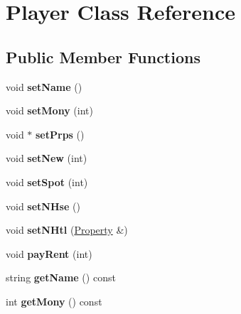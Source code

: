 \hypertarget{class_player}{}\section{Player Class Reference}
\label{class_player}
\subsection*{Public Member Functions}
\begin{DoxyCompactItemize}
\item 
\mbox{\label{class_player_a37fc1f766b05e107305976aa9e8d0fc4}} 
void {\bfseries set\+Name} ()
\item 
\mbox{\label{class_player_ad313d5325b68a6e80a77f02d8babd6d9}} 
void {\bfseries set\+Mony} (int)
\item 
\mbox{\label{class_player_a167fd9256e85be99d2550933a6baf5ad}} 
void $\ast$ {\bfseries set\+Prps} ()
\item 
\mbox{\label{class_player_af3a89c458fbed769ff76bdb398f1ea12}} 
void {\bfseries set\+New} (int)
\item 
\mbox{\label{class_player_a8451a38d308061343657e96eecf0d15e}} 
void {\bfseries set\+Spot} (int)
\item 
\mbox{\label{class_player_aa8af9e54e5838a1952b0bb9686f6d8af}} 
void {\bfseries set\+N\+Hse} ()
\item 
\mbox{\label{class_player_a9bc57b0b212853ce5b0e58bbc8a93b60}} 
void {\bfseries set\+N\+Htl} (\hyperlink{class_property}{Property} \&)
\item 
\mbox{\label{class_player_ad3dcd2fe41dcca95750c1c5f086479fe}} 
void {\bfseries pay\+Rent} (int)
\item 
\mbox{\label{class_player_a4939193fc637f75bf7a11118334dae7e}} 
string {\bfseries get\+Name} () const
\item 
\mbox{\label{class_player_a3764cbbcd74442dd129db4d7e365d5ad}} 
int {\bfseries get\+Mony} () const

\end{DoxyCompactItemize}
